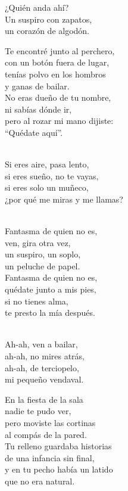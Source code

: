 \begin{lyrics}
¿Quién anda ahí?\\
Un suspiro con zapatos,\\
un corazón de algodón.

Te encontré junto al perchero,\\
con un botón fuera de lugar,\\
tenías polvo en los hombros\\
y ganas de bailar.\\
No eras dueño de tu nombre,\\
ni sabías dónde ir,\\
pero al rozar mi mano dijiste:\\
“Quédate aquí”.

\\
Si eres aire, pasa lento,\\
si eres sueño, no te vayas,\\
si eres solo un muñeco,\\
¿por qué me miras y me llamas?

\\
Fantasma de quien no es,\\
ven, gira otra vez,\\
un suspiro, un soplo,\\
un peluche de papel.\\
Fantasma de quien no es,\\
quédate junto a mis pies,\\
si no tienes alma,\\
te presto la mía después.

\\
Ah-ah, ven a bailar,\\
ah-ah, no mires atrás,\\
ah-ah, de terciopelo,\\
mi pequeño vendaval.

En la fiesta de la sala\\
nadie te pudo ver,\\
pero moviste las cortinas\\
al compás de la pared.\\
Tu relleno guardaba historias\\
de una infancia sin final,\\
y en tu pecho había un latido\\
que no era natural.


\end{lyrics}
